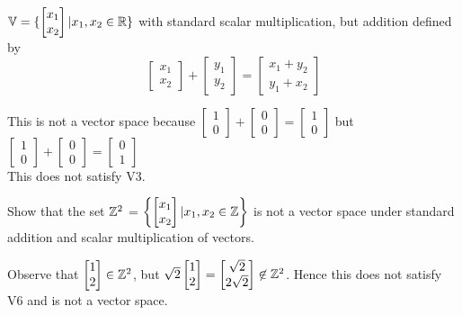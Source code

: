 \documentclass[english, 12pt]{article}
\begin{document}
\begin{exmp}
$\mathbb{V} = \{\begin{bmatrix} x_1 \\ x_2 \end{bmatrix} | x_1,x_2 \in {\mathbb{R}}\}$ with standard scalar multiplication, but addition defined by
\[\begin{bmatrix} x_1 \\ x_2 \end{bmatrix} + \begin{bmatrix} y_1 \\ y_2 \end{bmatrix} = \begin{bmatrix} x_1 + y_2 \\ y_1 + x_2 \end{bmatrix}\]
\begin{sol}
This is not a vector space because $\begin{bmatrix} 1 \\ 0 \end{bmatrix} + \begin{bmatrix} 0 \\ 0 \end{bmatrix} = \begin{bmatrix} 1 \\ 0 \end{bmatrix}$ but $\begin{bmatrix} 1 \\ 0 \end{bmatrix} + \begin{bmatrix} 0 \\ 0 \end{bmatrix} = \begin{bmatrix} 0 \\ 1 \end{bmatrix}$\\
This does not satisfy V3.
\end{sol}
\end{exmp}

\begin{exmp}
Show that the set ${\mathbb{Z}}^2$ = $\left\{\begin{bmatrix} x_1 \\ x_2 \end{bmatrix} | x_1,x_2 \in {\mathbb{Z}} \right\}$ is not a vector space under standard addition and scalar multiplication of vectors.
\begin{sol}
Observe that $\begin{bmatrix} 1 \\ 2 \end{bmatrix} \in {\mathbb{Z}}^2$, but $\sqrt{2} \begin{bmatrix} 1 \\ 2 \end{bmatrix} = \begin{bmatrix} \sqrt{2} \\ 2 \sqrt{2} \end{bmatrix} \not\in {\mathbb{Z}}^2$. Hence this does not satisfy V6 and is not a vector space.
\end{sol}
\end{exmp}
\end{document}
